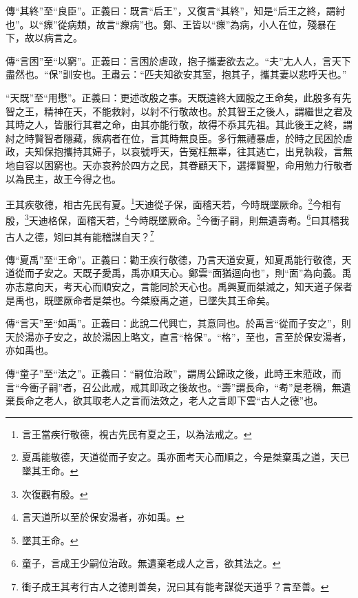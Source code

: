 {\noindent\zhuan{}\fzbyks 傳“其終”至“良臣”。正義曰：既言“后王”，又復言“其終”，知是“后王之終，謂紂也”。以“瘝”從病類，故言“瘝病”也。鄭、王皆以“瘝”為病，小人在位，殘暴在下，故以病言之。 \par}

{\noindent\zhuan{}\fzbyks 傳“言困”至“以窮”。正義曰：言困於虐政，抱子攜妻欲去之。“夫”尢人人，言天下盡然也。“保”訓安也。王肅云：“匹夫知欲安其室，抱其子，攜其妻以悲呼天也。” \par}

{\noindent\shu{}\fzkt “天既”至“用懋”。正義曰：更述改殷之事。天既遠終大國殷之王命矣，此殷多有先智之王，精神在天，不能救紂，以紂不行敬故也。於其智王之後人，謂繼世之君及其時之人，皆服行其君之命，由其亦能行敬，故得不忝其先祖。其此後王之終，謂紂之時賢智者隱藏，瘝病者在位，言其時無良臣。多行無禮暴虐，於時之民困於虐政，夫知保抱攜持其婦子，以哀號呼天，告冤枉無辜，往其逃亡，出見執殺，言無地自容以困窮也。天亦哀矜於四方之民，其眷顧天下，選擇賢聖，命用勉力行敬者以為民主，故王今得之也。 \par}

王其疾敬德，相古先民有夏。\footnote{言王當疾行敬德，視古先民有夏之王，以為法戒之。}天迪從子保，面稽天若，今時既墜厥命。\footnote{夏禹能敬德，天道從而子安之。禹亦面考天心而順之，今是桀棄禹之道，天已墜其王命。}今相有殷，\footnote{次復觀有殷。}天迪格保，面稽天若，\footnote{言天道所以至於保安湯者，亦如禹。}今時既墜厥命。\footnote{墜其王命。}今衝子嗣，則無遺壽耇。\footnote{童子，言成王少嗣位治政。無遺棄老成人之言，欲其法之。}曰其稽我古人之德，矧曰其有能稽謀自天？\footnote{衝子成王其考行古人之德則善矣，況曰其有能考謀從天道乎？言至善。}


{\noindent\zhuan{}\fzbyks 傳“夏禹”至“王命”。正義曰：勸王疾行敬德，乃言天道安夏，知夏禹能行敬德，天道從而子安之。天既子愛禹，禹亦順天心。鄭雲“面猶迴向也”，則“面”為向義。禹亦志意向天，考天心而順安之，言能同於天心也。禹興夏而桀滅之，知天道子保者是禹也，既墜厥命者是桀也。今桀廢禹之道，已墜失其王命矣。 \par}

{\noindent\zhuan{}\fzbyks 傳“言天”至“如禹”。正義曰：此說二代興亡，其意同也。於禹言“從而子安之”，則天於湯亦子安之，故於湯因上略文，直言“格保”。“格”，至也，言至於保安湯者，亦如禹也。 \par}

{\noindent\zhuan{}\fzbyks 傳“童子”至“法之”。正義曰：“嗣位治政”，謂周公歸政之後，此時王末蒞政，而言“今衝子嗣”者，召公此戒，戒其即政之後故也。“壽”謂長命，“耇”是老稱，無遺棄長命之老人，欲其取老人之言而法效之，老人之言即下雲“古人之德”也。 \par}

